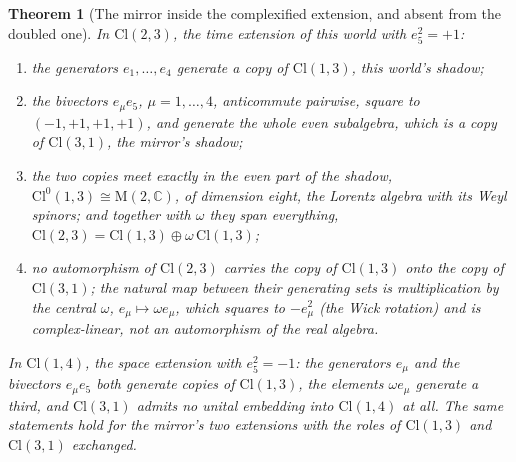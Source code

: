 \documentclass[11pt]{article}
\newtheorem{theorem}{Theorem}[section]
\theoremstyle{definition}
\theoremstyle{plain}
\newcommand{\changedmark}[2]{\marginpar{\raggedright\scriptsize\color{#1}#2}}
\providecommand{\C}{}\renewcommand{\C}{\mathbb{C}}
\providecommand{\Cl}{}\renewcommand{\Cl}{\mathrm{Cl}}
\providecommand{\Mat}{}\renewcommand{\Mat}{\mathrm{M}}
\begin{document}
\begin{theorem}[The mirror inside the complexified extension, and absent from the doubled one]\label{c:odd-extensions.mirror-inside-complexified-extension-absent-doubled}
\changedmark{gray}{reworded}
In $\Cl(2,3)$, the time extension of this world with $e_{5}^{2} = +1$:
\begin{enumerate}
\item[(i)] the generators $e_{1}, \ldots, e_{4}$ generate a copy of $\Cl(1,3)$, this world's shadow;
\item[(ii)] the bivectors $e_{\mu}e_{5}$, $\mu = 1, \ldots, 4$, anticommute pairwise, square to $(-1, +1, +1, +1)$, and generate the whole even subalgebra, which is a copy of $\Cl(3,1)$, the mirror's shadow;
\item[(iii)] the two copies meet exactly in the even part of the shadow, $\Cl^{0}(1,3) \cong \Mat(2,\C)$, of dimension eight, the Lorentz algebra with its Weyl spinors; and together with $\omega$ they span everything, $\Cl(2,3) = \Cl(1,3) \oplus \omega\,\Cl(1,3)$;
\item[(iv)] no automorphism of $\Cl(2,3)$ carries the copy of $\Cl(1,3)$ onto the copy of $\Cl(3,1)$; the natural map between their generating sets is multiplication by the central $\omega$, $e_{\mu} \mapsto \omega e_{\mu}$, which squares to $-e_{\mu}^{2}$ (the Wick rotation) and is complex-linear, not an automorphism of the real algebra.
\end{enumerate}
In $\Cl(1,4)$, the space extension with $e_{5}^{2} = -1$: the generators $e_{\mu}$ and the bivectors $e_{\mu}e_{5}$ both generate copies of $\Cl(1,3)$, the elements $\omega e_{\mu}$ generate a third, and $\Cl(3,1)$ admits no unital embedding into $\Cl(1,4)$ at all. The same statements hold for the mirror's two extensions with the roles of $\Cl(1,3)$ and $\Cl(3,1)$ exchanged.
\end{theorem}
\end{document}
